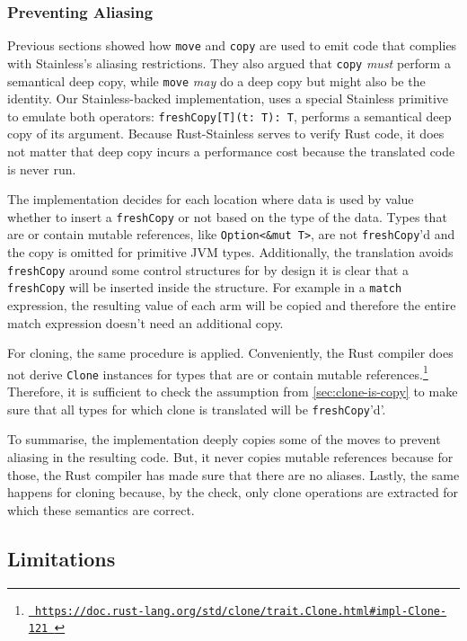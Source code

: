 \subsubsection{Preventing Aliasing}

Previous sections showed how \lstinline!move! and \lstinline!copy! are used to
emit code that complies with Stainless's aliasing restrictions. They also argued
that \lstinline!copy! \emph{must} perform a semantical deep copy, while
\lstinline!move! \emph{may} do a deep copy but might also be the identity. Our
Stainless-backed implementation, uses a special Stainless primitive to emulate
both operators: \lstinline!freshCopy[T](t: T): T!, performs a semantical deep
copy of its argument. Because Rust-Stainless serves to verify Rust code, it does
not matter that deep copy incurs a performance cost because the translated code
is never run.

The implementation decides for each location where data is used by value whether
to insert a \lstinline!freshCopy! or not based on the type of the data. Types
that are or contain mutable references, like \lstinline!Option<&mut T>!, are not
\lstinline!freshCopy!'d and the copy is omitted for primitive JVM types.
Additionally, the translation avoids \lstinline!freshCopy! around some control
structures for by design it is clear that a \lstinline!freshCopy! will be
inserted inside the structure. For example in a \lstinline!match! expression,
the resulting value of each arm will be copied and therefore the entire match
expression doesn't need an additional copy.

For cloning, the same procedure is applied. Conveniently, the Rust compiler does
not derive \lstinline!Clone! instances for types that are or contain mutable
references.\footnote{\href{}{\texttt{\color{MidnightBlue}
https://doc.rust-lang.org/std/clone/trait.Clone.html\#impl-Clone-121 }}}
Therefore, it is sufficient to check the assumption from
\autoref{sec:clone-is-copy} to make sure that all types for which clone is
translated will be \lstinline!freshCopy!'d'.

To summarise, the implementation deeply copies some of the moves to prevent
aliasing in the resulting code. But, it never copies mutable references because
for those, the Rust compiler has made sure that there are no aliases. Lastly,
the same happens for cloning because, by the check, only clone operations are
extracted for which these semantics are correct.


\subsection{Limitations}
\label{trans-limitations}

